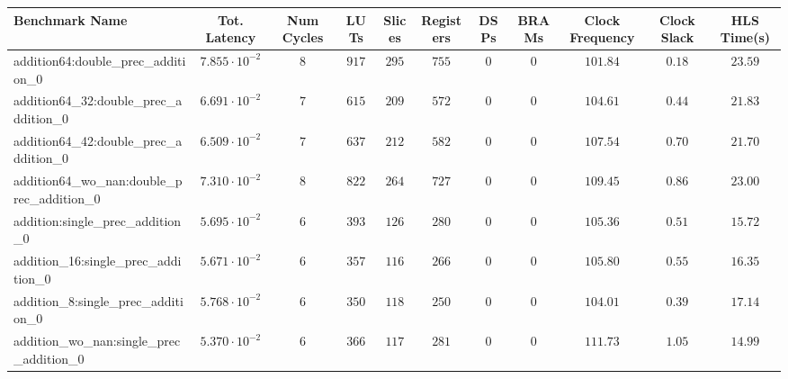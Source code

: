 \begin{tabular}{|l|c|c|c|c|c|c|c|c|c|c|}
\hline
Benchmark Name                                            & Tot. Latency            & Num Cycles & LUTs       & Slices    & Registers & DSPs    & BRAMs    & Clock Frequency & Clock Slack & HLS Time(s) \\
\hline
addition64:double\_prec\_addition\_0                      & $ 7.855 \cdot 10^{-2} $ & $ 8      $ & $ 917    $ & $ 295   $ & $ 755   $ & $ 0   $ & $ 0    $ & $ 101.84      $ & $ 0.18    $ & $ 23.59   $ \\
addition64\_32:double\_prec\_addition\_0                  & $ 6.691 \cdot 10^{-2} $ & $ 7      $ & $ 615    $ & $ 209   $ & $ 572   $ & $ 0   $ & $ 0    $ & $ 104.61      $ & $ 0.44    $ & $ 21.83   $ \\
addition64\_42:double\_prec\_addition\_0                  & $ 6.509 \cdot 10^{-2} $ & $ 7      $ & $ 637    $ & $ 212   $ & $ 582   $ & $ 0   $ & $ 0    $ & $ 107.54      $ & $ 0.70    $ & $ 21.70   $ \\
addition64\_wo\_nan:double\_prec\_addition\_0             & $ 7.310 \cdot 10^{-2} $ & $ 8      $ & $ 822    $ & $ 264   $ & $ 727   $ & $ 0   $ & $ 0    $ & $ 109.45      $ & $ 0.86    $ & $ 23.00   $ \\
addition:single\_prec\_addition\_0                        & $ 5.695 \cdot 10^{-2} $ & $ 6      $ & $ 393    $ & $ 126   $ & $ 280   $ & $ 0   $ & $ 0    $ & $ 105.36      $ & $ 0.51    $ & $ 15.72   $ \\
addition\_16:single\_prec\_addition\_0                    & $ 5.671 \cdot 10^{-2} $ & $ 6      $ & $ 357    $ & $ 116   $ & $ 266   $ & $ 0   $ & $ 0    $ & $ 105.80      $ & $ 0.55    $ & $ 16.35   $ \\
addition\_8:single\_prec\_addition\_0                     & $ 5.768 \cdot 10^{-2} $ & $ 6      $ & $ 350    $ & $ 118   $ & $ 250   $ & $ 0   $ & $ 0    $ & $ 104.01      $ & $ 0.39    $ & $ 17.14   $ \\
addition\_wo\_nan:single\_prec\_addition\_0               & $ 5.370 \cdot 10^{-2} $ & $ 6      $ & $ 366    $ & $ 117   $ & $ 281   $ & $ 0   $ & $ 0    $ & $ 111.73      $ & $ 1.05    $ & $ 14.99   $ \\

\end{tabular}
